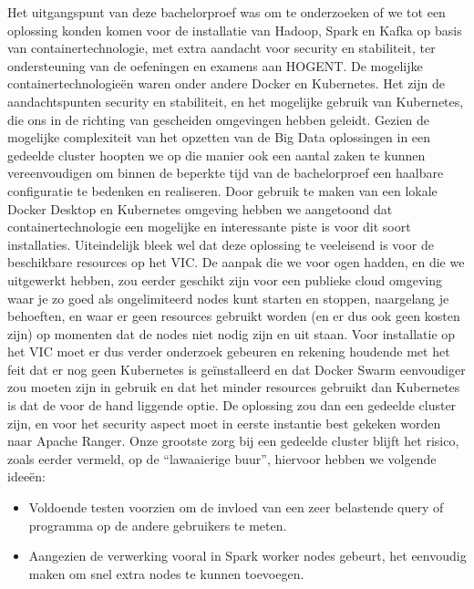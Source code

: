 Het uitgangspunt van deze bachelorproef was om te onderzoeken of we tot een oplossing konden komen voor de installatie van Hadoop, Spark en Kafka op basis van containertechnologie, met extra aandacht voor security en stabiliteit, ter ondersteuning van de oefeningen en examens aan HOGENT.
\newline
De mogelijke containertechnologieën waren onder andere Docker en Kubernetes.
\newline
\newline
Het zijn de aandachtspunten security en stabiliteit, en het mogelijke gebruik van Kubernetes, die ons in de richting van gescheiden omgevingen hebben geleidt. Gezien de mogelijke complexiteit van het opzetten van de Big Data oplossingen in een gedeelde cluster hoopten we op die manier ook een aantal zaken te kunnen vereenvoudigen om binnen de beperkte tijd van de bachelorproef een haalbare configuratie te bedenken en realiseren.
\newline
\newline
Door gebruik te maken van een lokale Docker Desktop en Kubernetes omgeving hebben we aangetoond dat containertechnologie een mogelijke en interessante piste is voor dit soort installaties.
\newline
Uiteindelijk bleek wel dat deze oplossing te veeleisend is voor de beschikbare resources op het VIC. De aanpak die we voor ogen hadden, en die we uitgewerkt hebben, zou eerder geschikt zijn voor een publieke cloud omgeving waar je zo goed als ongelimiteerd nodes kunt starten en stoppen, naargelang je behoeften, en waar er geen resources gebruikt worden (en er dus ook geen kosten zijn) op momenten dat de nodes niet nodig zijn en uit staan.
\newline
\newline
Voor installatie op het VIC moet er dus verder onderzoek gebeuren en rekening houdende met het feit dat er nog geen Kubernetes is geïnstalleerd en dat Docker Swarm eenvoudiger zou moeten zijn in gebruik en dat het minder resources gebruikt dan Kubernetes is dat de voor de hand liggende optie.
\newline
De oplossing zou dan een gedeelde cluster zijn, en voor het security aspect moet in eerste instantie best gekeken worden naar Apache Ranger.
\newline
Onze grootste zorg bij een gedeelde cluster blijft het risico, zoals eerder vermeld, op de ``lawaaierige buur'', hiervoor hebben we volgende ideeën:
\newline
\begin{itemize}
    \item Voldoende testen voorzien om de invloed van een zeer belastende query of programma op de andere gebruikers te meten.
    \item Aangezien de verwerking vooral in Spark worker nodes gebeurt, het eenvoudig maken om snel extra nodes te kunnen toevoegen.
\end{itemize}


